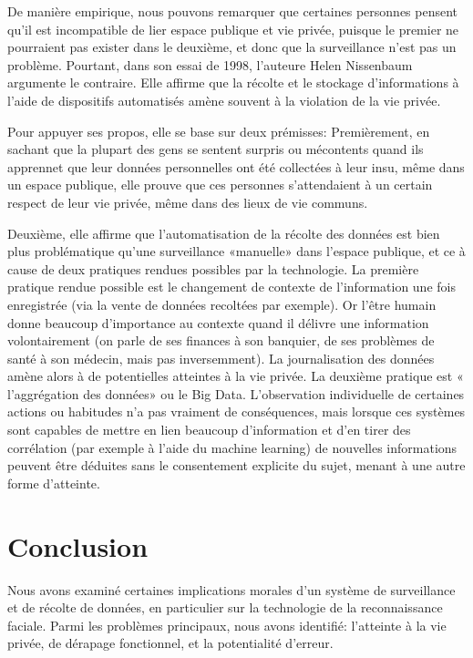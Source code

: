 De manière empirique, nous pouvons remarquer que certaines personnes pensent qu’il est incompatible de lier
espace publique et vie privée, puisque le premier ne pourraient pas exister dans le deuxième, et donc que la
surveillance n’est pas un problème. Pourtant, dans son essai de 1998, l’auteure Helen Nissenbaum argumente le
contraire. Elle affirme que la récolte et le stockage d’informations à l’aide de dispositifs automatisés amène souvent
à la violation de la vie privée.

Pour appuyer ses propos, elle se base sur deux prémisses:
Premièrement, en sachant que la plupart des gens se sentent surpris ou mécontents quand ils apprennet que leur
données personnelles ont été collectées à leur insu, même dans un espace publique, elle prouve que ces personnes
s’attendaient à un certain respect de leur vie privée, même dans des lieux de vie communs.

Deuxième, elle affirme que l’automatisation de la récolte des données est bien plus problématique qu’une
surveillance «manuelle» dans l’espace publique, et ce à cause de deux pratiques rendues possibles par la
technologie. La première pratique rendue possible est le changement de contexte de l’information une fois
enregistrée (via la vente de données recoltées par exemple). Or l’être humain donne beaucoup d’importance au
contexte quand il délivre une information volontairement (on parle de ses finances à son banquier, de ses
problèmes de santé à son médecin, mais pas inversemment). La journalisation des données amène alors à de
potentielles atteintes à la vie privée. La deuxième pratique est « l’aggrégation des données» ou le Big Data.
L’observation individuelle de certaines actions ou habitudes n’a pas vraiment de conséquences, mais lorsque ces
systèmes sont capables de mettre en lien beaucoup d’information et d’en tirer des corrélation (par exemple à l’aide
du machine learning) de nouvelles informations peuvent être déduites sans le consentement explicite du sujet,
menant à une autre forme d’atteinte.

\section{Conclusion}
Nous avons examiné certaines implications morales d’un système de surveillance et de récolte de données, en
particulier sur la technologie de la reconnaissance faciale. Parmi les problèmes principaux, nous avons identifié:
l’atteinte à la vie privée, de dérapage fonctionnel, et la potentialité d’erreur.

